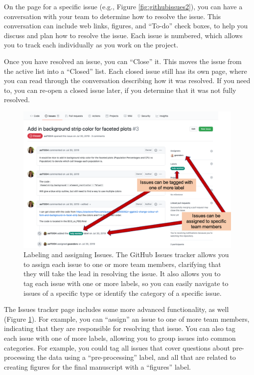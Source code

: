 \documentclass[]{tufte-book}
\begin{document}
On the page for a specific issue (e.g., Figure \ref{fig:githubissues2}), you
can have a conversation with your team to determine how to resolve the issue.
This conversation can include web links, figures, and ``To-do'' check boxes, to
help you discuss and plan how to resolve the issue. Each issue is numbered,
which allows you to track each individually as you work on the project.

Once you have resolved an issue, you can ``Close'' it. This moves the issue
from the active list into a ``Closed'' list. Each closed issue still has its
own page, where you can read through the conversation describing how it
was resolved. If you need to, you can re-open a closed issue later, if you
determine that it was not fully resolved.

\begin{figure}
\includegraphics[width=\textwidth]{figures/github_issues3} \caption[Labeling and assigning Issues]{Labeling and assigning Issues. The GitHub Issues tracker allows you to assign each issue to one or more team members, clarifying that they will take the lead in resolving the issue. It also allows you to tag each issue with one or more labels, so you can easily navigate to issues of a specific type or identify the category of a specific issue.}\label{fig:githubissues3}
\end{figure}

The Issues tracker page includes some more advanced functionality, as well
(Figure \ref{fig:githubissues3}). For example, you can ``assign'' an issue to one
of more team members, indicating that they are responsible for resolving that
issue. You can also tag each issue with one of more labels, allowing you to
group issues into common categories. For example, you could tag all issues that
cover questions about pre-processing the data using a ``pre-processing'' label,
and all that are related to creating figures for the final manuscript with a
``figures'' label.
\end{document}

